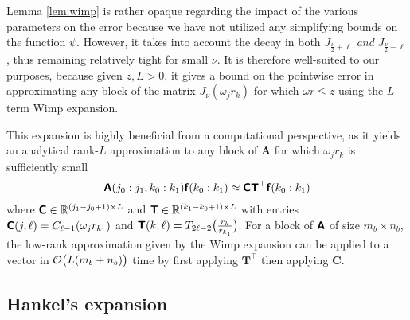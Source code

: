 Lemma \ref{lem:wimp} is rather opaque regarding the impact of the various
parameters on the error because we have not utilized any simplifying bounds on
the function $\psi$. However, it takes into account the decay in both
$J_{\frac{\nu}{2}+\ell}$ \textit{and} $J_{\frac{\nu}{2}-\ell}$, thus remaining
relatively tight for small $\nu$. It is therefore well-suited to our purposes,
because given $z, L > 0$, it gives a bound on the pointwise error in
approximating any block of the matrix $J_\nu(\omega_j r_k)$ for which $\omega r
\leq z$ using the $L$-term Wimp expansion. 

This expansion is highly beneficial from a computational perspective, as it
yields an analytical rank-$L$ approximation to any block of $\bm{A}$ for which
$\omega_j r_k$ is sufficiently small
\begin{equation}
    \bm{\mathsf{A}}(j_0:j_1, k_0:k_1) \bm{\mathsf{f}}(k_0:k_1)
    \approx \bm{\mathsf{C}}\bm{\mathsf{T}}^\top \bm{\mathsf{f}}(k_0:k_1)
\end{equation}
where $\bm{\mathsf{C}} \in \mathbb{R}^{(j_1-j_0+1) \times L}$ and $\bm{\mathsf{T}} \in \mathbb{R}^{(k_1-k_0+1)
\times L}$ with entries $\bm{\mathsf{C}}(j,\ell) = C_{\ell-1}(\omega_j r_{k_1})$ and
$\bm{\mathsf{T}}(k,\ell) = T_{2\ell-2}\big(\frac{r_k}{r_{k_1}}\big)$. For a block of
$\bm{\mathsf{A}}$ of size $m_b \times n_b$, the low-rank approximation given by the Wimp
expansion can be applied to a vector in $\mathcal{O}\big(L(m_b + n_b)\big)$ time by
first applying $\bm{T}^\top$ then applying $\bm{C}$.

\subsection{Hankel's expansion}
\label{sec:asymptotic}

